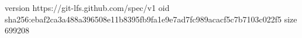 version https://git-lfs.github.com/spec/v1
oid sha256:ebaf2ca3a488a396508e11b8395fb9fa1e9e7ad7fc989acacf5c7b7103c022f5
size 699208
